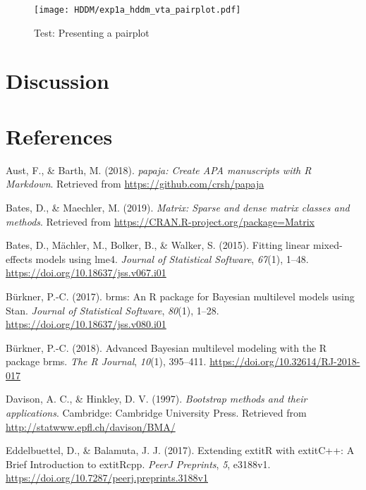 \documentclass[
  english,
  man]{apa6}
\begin{document}
\begin{figure}
\centering
\texttt{[image: HDDM/exp1a\_hddm\_vta\_pairplot.pdf]}
\caption{Test: Presenting a pairplot}
\end{figure}

\hypertarget{discussion}{%
\section{Discussion}\label{discussion}}

\newpage

\hypertarget{references}{%
\section{References}\label{references}}

\begingroup
\setlength{\parindent}{-0.5in}
\setlength{\leftskip}{0.5in}

\hypertarget{refs}{}
\leavevmode\hypertarget{ref-R-papaja}{}%
Aust, F., \& Barth, M. (2018). \emph{papaja: Create APA manuscripts with R Markdown}. Retrieved from \url{https://github.com/crsh/papaja}

\leavevmode\hypertarget{ref-R-Matrix}{}%
Bates, D., \& Maechler, M. (2019). \emph{Matrix: Sparse and dense matrix classes and methods}. Retrieved from \url{https://CRAN.R-project.org/package=Matrix}

\leavevmode\hypertarget{ref-R-lme4}{}%
Bates, D., Mächler, M., Bolker, B., \& Walker, S. (2015). Fitting linear mixed-effects models using lme4. \emph{Journal of Statistical Software}, \emph{67}(1), 1--48. \url{https://doi.org/10.18637/jss.v067.i01}

\leavevmode\hypertarget{ref-R-brms_a}{}%
Bürkner, P.-C. (2017). brms: An R package for Bayesian multilevel models using Stan. \emph{Journal of Statistical Software}, \emph{80}(1), 1--28. \url{https://doi.org/10.18637/jss.v080.i01}

\leavevmode\hypertarget{ref-R-brms_b}{}%
Bürkner, P.-C. (2018). Advanced Bayesian multilevel modeling with the R package brms. \emph{The R Journal}, \emph{10}(1), 395--411. \url{https://doi.org/10.32614/RJ-2018-017}

\leavevmode\hypertarget{ref-R-boot}{}%
Davison, A. C., \& Hinkley, D. V. (1997). \emph{Bootstrap methods and their applications}. Cambridge: Cambridge University Press. Retrieved from \url{http://statwww.epfl.ch/davison/BMA/}

\leavevmode\hypertarget{ref-R-Rcpp_b}{}%
Eddelbuettel, D., \& Balamuta, J. J. (2017). Extending extitR with extitC++: A Brief Introduction to extitRcpp. \emph{PeerJ Preprints}, \emph{5}, e3188v1. \url{https://doi.org/10.7287/peerj.preprints.3188v1}
\end{document}
